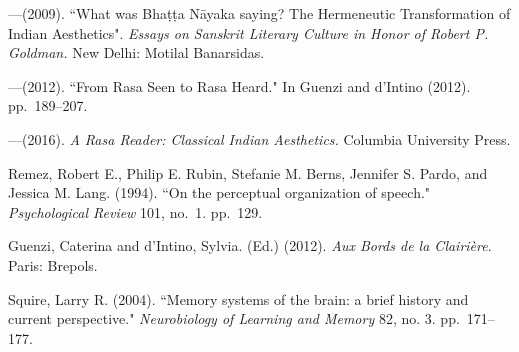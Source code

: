 \begin{thebibliography}{99}
---\kern3pt(2009). ``What was Bhaṭṭa Nāyaka saying? The Hermeneutic Transformation of Indian Aesthetics". \textsl{Essays on Sanskrit Literary Culture in Honor of Robert P. Goldman.} New Delhi: Motilal Banarsidas.

---\kern3pt(2012). ``From Rasa Seen to Rasa Heard." In Guenzi and d’Intino (2012). pp.~189--207.

---\kern3pt(2016). \textsl{A Rasa Reader: Classical Indian Aesthetics.} Columbia University Press.

Remez, Robert E., Philip E. Rubin, Stefanie M. Berns, Jennifer S. Pardo, and Jessica M. Lang. (1994). ``On the perceptual organization of speech." \textsl{Psychological Review} 101, no.~1. pp.~129.

Guenzi, Caterina and d'Intino, Sylvia. (Ed.) (2012). \textsl{Aux Bords de la Clairière}. Paris: Brepols.

Squire, Larry R. (2004). ``Memory systems of the brain: a brief history and current perspective." \textsl{Neurobiology of Learning and Memory} 82, no. 3. pp.~171--177.
\end{thebibliography}

\theendnotes
\label{chapter\thechapter:end}
